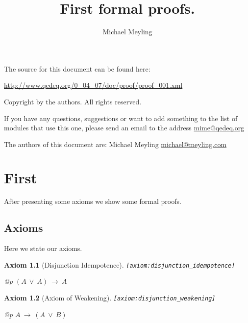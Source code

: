 \documentclass[a4paper,german,10pt,twoside]{book}
\title{First formal proofs.}
\author{
Michael Meyling
}
\newtheorem{ax}{Axiom}
\theoremstyle{definition}
\theoremstyle{remark}
\begin{document}
\maketitle

\setlength{\parskip}{5pt plus 2pt minus 1pt}
\mbox{}
\vfill

\par
The source for this document can be found here:
\par
\url{http://www.qedeq.org/0_04_07/doc/proof/proof_001.xml}

\par
Copyright by the authors. All rights reserved.
\par
If you have any questions, suggestions or want to add something to the list of modules that use this one, please send an email to the address \href{mailto:mime@qedeq.org}{mime@qedeq.org}

\par
The authors of this document are:
Michael Meyling \href{mailto:michael@meyling.com}{michael@meyling.com}



\setlength{\parskip}{0pt}
\tableofcontents

\setlength{\parskip}{5pt plus 2pt minus 1pt}

\chapter{First} \label{chapter1} \hypertarget{chapter1}{}

After presenting some axioms we show some formal proofs.

\section{Axioms} \label{chapter1_section1} \hypertarget{chapter1_section1}{}
Here we state our axioms.

\begin{ax}[Disjunction Idempotence]
\label{axiom:disjunction_idempotence} \hypertarget{axiom:disjunction_idempotence}{}
{\tt \tiny [\verb]axiom:disjunction_idempotence]]}
\mbox{}
\begin{longtable}{{@{\extracolsep{\fill}}p{\linewidth}}}
\centering $(A\ \lor\ A)\ \rightarrow\ A$
\end{longtable}

\end{ax}


\begin{ax}[Axiom of Weakening]
\label{axiom:disjunction_weakening} \hypertarget{axiom:disjunction_weakening}{}
{\tt \tiny [\verb]axiom:disjunction_weakening]]}
\mbox{}
\begin{longtable}{{@{\extracolsep{\fill}}p{\linewidth}}}
\centering $A\ \rightarrow\ (A\ \lor\ B)$
\end{longtable}

\end{ax}
\end{document}
